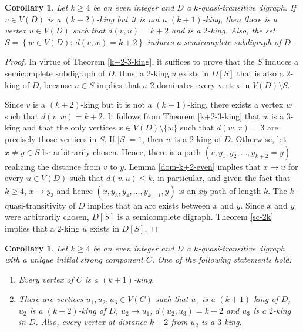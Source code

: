 \documentclass[preprint]{elsarticle}
\newtheorem{cor}[thm]{Corollary}
\begin{document}
\begin{cor} \label{2k-even}
Let $k \ge 4$ be an even integer and $D$ a $k$-quasi-transitive digraph.   If $v \in V(D)$ is a $(k+2)$-king but it is not a $(k+1)$-king, then there is a vertex $u \in V(D)$ such that $d(v,u) = k+2$ and is a $2$-king.   Also, the set $S = \left\{ w \in V(D) \colon\ d(v,w) = k+2 \right\}$ induces a semicomplete subdigraph of $D$.
\end{cor}

\begin{proof}
In virtue of Theorem \ref{k+2-3-king}, it suffices to prove that the $S$ induces a semicomplete subdigraph of $D$, thus, a $2$-king $u$ exists in $D[S]$ that is also a $2$-king of $D$, because $u \in S$ implies that $u$ $2$-dominates every vertex in $V(D) \setminus S$.

Since $v$ is a $(k+2)$-king but it is not a $(k+1)$-king, there exists a vertex $w$ such that $d(v,w) = k+2$.   It follows from Theorem \ref{k+2-3-king} that $w$ is a $3$-king and that the only vertices $x \in V(D) \setminus \{ w \}$ such that $d(w,x) = 3$ are precisely those vertices in $S$.   If $|S| = 1$, then $w$ is a $2$-king of $D$.   Otherwise, let $x \ne y \in S$ be arbitrarily chosen.   Hence, there is a path $(v, y_1, y_2, \dots, y_{k+2} = y)$ realizing the distance from $v$ to $y$.   Lemma \ref{dom-k+2-even} implies that $x \to u$ for every $u \in V(D)$ such that $d(v,u) \le k$, in particular, and given the fact that $k \ge 4$, $x \to y_3$ and hence $(x, y_3, y_4, \dots, y_{k+1}, y)$ is an $xy$-path of length $k$.   The $k$-quasi-transitivity of $D$ implies that an arc exists between $x$ and $y$.   Since $x$ and $y$ were arbitrarily chosen, $D[S]$ is a semicomplete digraph.   Theorem \ref{sc-2k} implies that a $2$-king $u$ exists in $D[S]$.
\end{proof}

\begin{cor} \label{even-k+1-2-fin}
Let $k \ge 4$ be an even integer and $D$ a $k$-quasi-transitive digraph with a unique initial strong component $C$.   One of the following statements hold:

\begin{enumerate}
	\item Every vertex of $C$ is a $(k+1)$-king.
	
	\item There are vertices $u_1, u_2, u_3 \in V(C)$ such that $u_1$ is a $(k+1)$-king of $D$, $u_2$ is a $(k+2)$-king of $D$, $u_2 \to u_1$, $d(u_2, 					u_3) = k+2$ and $u_3$ is a $2$-king in $D$.   Also, every vertex at distance $k+2$ from $u_2$ is a $3$-king.
\end{enumerate}
\end{cor}
\end{document}
